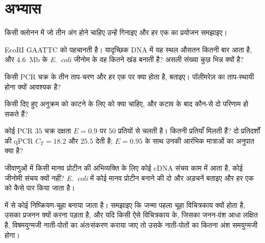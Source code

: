 \section{अभ्यास}

\begin{exercise}[$\star$]\label{exo:b3:genetic-engineering:1}
किसी क्लोनन  में जो तीन अंग होने चाहिए उन्हें गिनाइए और हर एक
का प्रयोजन समझाइए।
\end{exercise}

\begin{exercise}[$\star$]\label{exo:b3:genetic-engineering:2}
EcoRI GAATTC को पहचानती है। यादृच्छिक DNA में यह स्थल औसतन कितनी बार
आता है, और \qty{4.6}{Mb} के \emph{E.~coli} जीनोम के वह कितने खंड बनाती
है? असली संख्या कुछ भिन्न क्यों है?
\end{exercise}

\begin{exercise}[$\star$]\label{exo:b3:genetic-engineering:3}
किसी PCR चक्र के तीन ताप-चरण और हर एक पर क्या होता है, बताइए।
पॉलीमरेज़ का ताप-स्थायी होना क्यों आवश्यक है?
\end{exercise}

\begin{exercise}[$\star$]\label{exo:b3:genetic-engineering:4}
किसी दिए हुए अनुक्रम को काटने के लिए  को क्या चाहिए, और कटाव के
बाद कौन-से दो परिणाम हो सकते हैं?
\end{exercise}

\begin{exercise}[$\star\star$]\label{exo:b3:genetic-engineering:5}
कोई PCR $35$ चक्र दक्षता $E = 0.9$ पर $50$ प्रतियों से चलती है। कितनी
प्रतियाँ मिलती हैं? दो प्रतिदर्शों की qPCR $C_{T} = 18.2$ और $25.5$
देती है; $E = 0.95$ के साथ उनकी आरंभिक मात्राओं का अनुपात क्या है?
\end{exercise}

\begin{exercise}[$\star\star$]\label{exo:b3:genetic-engineering:6}
जीवाणुओं में किसी मानव प्रोटीन की अभिव्यक्ति के लिए कोई cDNA संचय काम
में आता है, कोई जीनोमी संचय क्यों नहीं? \emph{E.~coli} में कोई मानव
प्रोटीन बनाने की दो और अड़चनें बताइए और हर एक को कैसे पार किया जाता है।
\end{exercise}

\begin{exercise}[$\star\star$]\label{exo:b3:genetic-engineering:7}
 में  से कोई निष्क्रियण-चूहा बनाया
जाता है। समझाइए कि जन्मा पहला चूहा विचित्रकाय क्यों होता है, उसका
प्रजनन क्यों करना पड़ता है, और यदि किसी ऐसे विचित्रकाय के, जिसका
जनन-वंश आधा लक्षित है, विषमयुग्मजी नाती-पोतों का अंतःसंकरण कराया जाए तो
उसके नाती-पोतों का कितना अंश समयुग्मजी  होगा।
\end{exercise}

